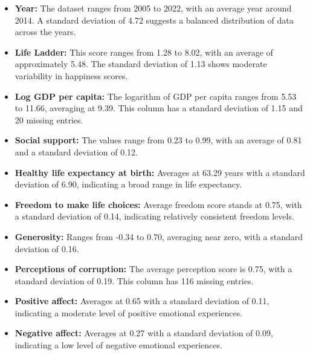                \begin{itemize}
                        \item \textbf{Year:} The dataset ranges from 2005 to 2022, with an average year around 2014. A standard deviation of 4.72 suggests a balanced distribution of data across the years.

                        \item \textbf{Life Ladder:} This score ranges from 1.28 to 8.02, with an average of approximately 5.48. The standard deviation of 1.13 shows moderate variability in happiness scores.

                        \item \textbf{Log GDP per capita:} The logarithm of GDP per capita ranges from 5.53 to 11.66, averaging at 9.39. This column has a standard deviation of 1.15 and 20 missing entries.

                        \item \textbf{Social support:} The values range from 0.23 to 0.99, with an average of 0.81 and a standard deviation of 0.12.

                        \item \textbf{Healthy life expectancy at birth:} Averages at 63.29 years with a standard deviation of 6.90, indicating a broad range in life expectancy.

                        \item \textbf{Freedom to make life choices:} Average freedom score stands at 0.75, with a standard deviation of 0.14, indicating relatively consistent freedom levels.

                        \item \textbf{Generosity:} Ranges from -0.34 to 0.70, averaging near zero, with a standard deviation of 0.16.

                        \item \textbf{Perceptions of corruption:} The average perception score is 0.75, with a standard deviation of 0.19. This column has 116 missing entries.

                        \item \textbf{Positive affect:} Averages at 0.65 with a standard deviation of 0.11, indicating a moderate level of positive emotional experiences.

                        \item \textbf{Negative affect:} Averages at 0.27 with a standard deviation of 0.09, indicating a low level of negative emotional experiences.
                \end{itemize}

